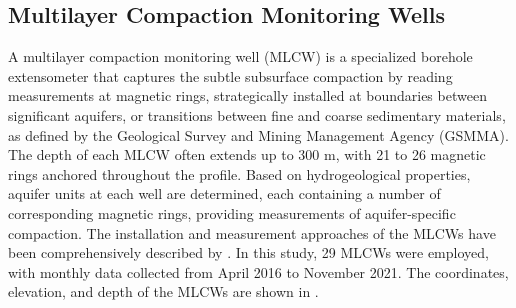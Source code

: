 
\subsection{Multilayer Compaction Monitoring Wells}
\label{subsubsec:mlcw}

A multilayer compaction monitoring well (MLCW) is a specialized borehole extensometer that captures the subtle subsurface compaction by reading measurements at magnetic rings, strategically installed at boundaries between significant aquifers, or transitions between fine and coarse sedimentary materials, as defined by the Geological Survey and Mining Management Agency (GSMMA).  The depth of each MLCW often extends up to 300 m, with 21 to 26 magnetic rings anchored throughout the profile. Based on hydrogeological properties, aquifer units at each well are determined, each containing a number of corresponding magnetic rings, providing measurements of aquifer-specific compaction. The installation and measurement approaches of the MLCWs have been comprehensively described by \citep{Hung2021_MLCW}. In this study, 29 MLCWs were employed, with monthly data collected from April 2016 to November 2021.  The coordinates, elevation, and depth of the MLCWs are shown in .


